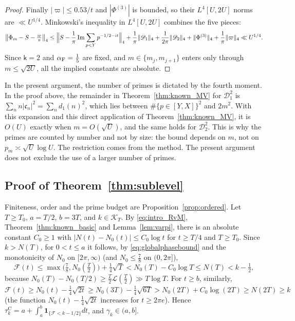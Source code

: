 \documentclass[11pt,a4paper]{article}
\makeatletter
\numberwithin{equation}{section}
\DeclareRobustCommand{\CGref}[1]{\ref{#1}}
\DeclareRobustCommand{\CGeqref}[1]{\eqref{#1}}
\let\CG@origref\ref
\let\CG@origeqref\eqref
\newcommand{\CG@gettip}[1]{\@ifundefined{CGTip@#1}{#1}{\csname CGTip@#1\endcsname}}
\DeclareRobustCommand{\CGref}[1]{\pdftooltip{\CG@origref{#1}}{\CG@gettip{#1}}}
\DeclareRobustCommand{\CGeqref}[1]{\pdftooltip{\CG@origeqref{#1}}{\CG@gettip{#1}}}
\theoremstyle{definition}
\theoremstyle{remark}
\newcommand{\Nz}{N_0} %
\newcommand{\lL}{\mathcal L}
\newcommand{\Fc}{\mathcal F}
\newcommand{\Ph}{\Phi}
\newcommand{\Ind}{\mathbf 1}
\newcommand{\Kc}{\mathcal K}
\makeatother
\begin{document}
\begin{proof}
Finally $|\varpi|\le0.53/t$ and $|\Ph^{(3)}|$ is bounded, so their $L^4[U,2U]$ norms are $\ll U^{1/4}$. Minkowski's inequality in $L^4[U,2U]$ combines the five pieces:
\begin{equation}
\bigl\|\Ph_m-S-\tfrac{\varpi}\pi\bigr\|_4\le\Bigl\|S-\frac1\pi\operatorname{Im}\sum_{p<Y}p^{-1/2-it}\Bigr\|_4+\frac1\pi\|\mathscr D_1\|_4+\frac1{2\pi}\|\mathscr D_2\|_4+\|\Ph^{(3)}\|_4+\frac1\pi\|\varpi\|_4\ll U^{1/4}.
\label{eq:disp_26}
\end{equation}
Since $\mathsf k=2$ and $\alpha_{\rm F}=\frac15$ are fixed, and $m\in\{m_j,m_{j+1}\}$ enters only through $m\le\sqrt{2U}$, all the implied constants are absolute.
\end{proof}

In the present argument, the number of primes is dictated by the fourth moment. In the proof above, the remainder in Theorem~\CGref{thm:known_MV} for $\mathscr D_1^2$ is $\sum_nn|\mathfrak c_n|^2=\sum_nd_1(n)^2$, which lies between $\#\{p\in[Y,X]\}^2$ and $2m^2$. With this expansion and this direct application of Theorem~\CGref{thm:known_MV}, it is $O(U)$ exactly when $m=O(\sqrt U)$, and the same holds for $\mathscr D_2^2$. This is why the primes are counted by number and not by size: the bound depends on $m$, not on $p_m\asymp\sqrt U\log U$. The restriction comes from the method. The present argument does not exclude the use of a larger number of primes.

\subsection{Proof of Theorem~\ref{thm:sublevel}}\label{subsec:proof_sublevel}
Finiteness, order and the prime budget are Proposition~\CGref{prop:ordered}. Let $T\ge T_0$, $a=T/2$, $b=3T$, and $k\in\Kc_T$. By \CGeqref{eq:intro_RvM}, Theorem~\CGref{thm:known_basic} and Lemma~\CGref{lem:varpi}, there is an absolute constant $C_0\ge1$ with $|N(t)-\Nz(t)|\le C_0\log t$ for $t\ge T/4$ and $T\ge T_0$. Since $k>N(T)$, for $0<t\le a$ it follows, by \CGeqref{eq:globalphasebound} and the monotonicity of $\Nz$ on $[2\pi,\infty)$ (and $\Nz\le\frac78$ on $(0,2\pi]$),
\begin{equation}
\Fc(t)\le\max\bigl(\tfrac78,\Nz(\tfrac T2)\bigr)+\tfrac14\sqrt T<\Nz(T)-C_0\log T\le N(T)<k-\tfrac12,
\label{eq:disp_27}
\end{equation}
because $\Nz(T)-\Nz(T/2)\ge\frac T2\lL(\frac T2)\gg T\log T$. For $t\ge b$, similarly, $\Fc(t)\ge\Nz(t)-\frac14\sqrt{2t}\ge\Nz(3T)-\frac14\sqrt{6T}>\Nz(2T)+C_0\log(2T)\ge N(2T)\ge k$ (the function $\Nz(t)-\frac14\sqrt{2t}$ increases for $t\ge2\pi e$). Hence $\tau_{k}^{\mathrm C}=a+\int_a^b\Ind_{\{\Fc<k-1/2\}}dt$, and $\gamma_k\in(a,b]$.
\end{document}
